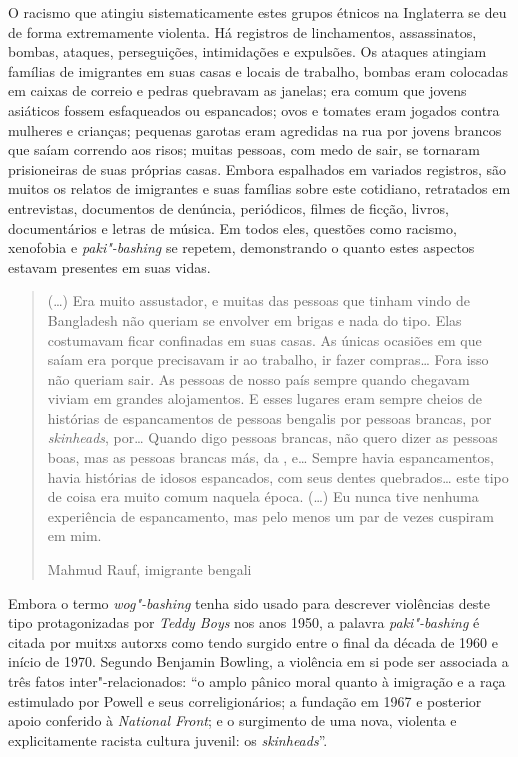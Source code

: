 O racismo que atingiu sistematicamente estes grupos étnicos na Inglaterra se deu de forma extremamente violenta. Há registros de linchamentos, assassinatos, bombas, ataques, perseguições, intimidações e expulsões. Os ataques atingiam famílias de imigrantes em suas casas e locais de trabalho, bombas eram colocadas em caixas de correio e pedras quebravam as janelas; era comum que jovens asiáticos fossem esfaqueados ou espancados; ovos e tomates eram jogados contra mulheres e crianças; pequenas garotas eram agredidas na rua por jovens brancos que saíam correndo aos risos; muitas pessoas, com medo de sair, se tornaram prisioneiras de suas próprias casas. Embora espalhados em variados registros, são muitos os relatos de imigrantes e suas famílias sobre este cotidiano, retratados em entrevistas, documentos de denúncia, periódicos, filmes de ficção, livros, documentários e letras de música. Em todos eles, questões como racismo, xenofobia e \emph{paki"-bashing} se repetem, demonstrando o quanto estes aspectos estavam presentes em suas vidas.

\begin{quote}
(\ldots{}) Era muito assustador, e muitas das pessoas que tinham vindo de Bangladesh não queriam se envolver em brigas e nada do tipo. Elas costumavam ficar confinadas em suas casas. As únicas ocasiões em que saíam era porque precisavam ir ao trabalho, ir fazer compras\ldots{} Fora isso não queriam sair. As pessoas de nosso país sempre quando chegavam viviam em grandes alojamentos. E esses lugares eram sempre cheios de histórias de espancamentos de pessoas bengalis por pessoas brancas, por \emph{skinheads}, por\ldots{} Quando digo pessoas brancas, não quero dizer as pessoas boas, mas as pessoas brancas más, da , e\ldots{} Sempre havia espancamentos, havia histórias de idosos espancados, com seus dentes quebrados\ldots{} este tipo de coisa era muito comum naquela época. (\ldots{}) Eu nunca tive nenhuma experiência de espancamento, mas pelo menos um par de vezes cuspiram em mim.

Mahmud Rauf, imigrante bengali
\end{quote}

Embora o termo \emph{wog"-bashing} tenha sido usado para descrever violências deste tipo protagonizadas por \emph{Teddy Boys} nos anos 1950, a palavra \emph{paki"-bashing} é citada por muitxs autorxs como tendo surgido entre o final da década de 1960 e início de 1970. Segundo Benjamin Bowling, a violência em si pode ser associada a três fatos inter"-relacionados: ``o amplo pânico moral quanto à imigração e a raça estimulado por Powell e seus correligionários; a fundação em 1967 e posterior apoio conferido à \emph{National Front}; e o surgimento de uma nova, violenta e explicitamente racista cultura juvenil: os \emph{skinheads}''.

